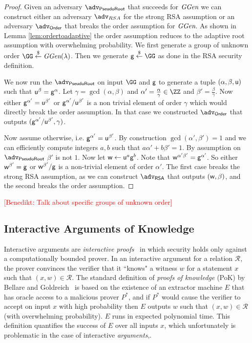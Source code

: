 \documentclass{article}
\theoremstyle{definition}
\newcommand{\benedikt}[1]{{\textcolor{red}{[Benedikt: #1]}}}
\newcommand{\benedikt}[1]{}
\begin{document}
\begin{proof}
	Given an adversary $\adv_{\textsf{PseudoRoot}}$ that succeeds for $\textit{GGen}$ we can construct either an adversary $\adv_{RSA}$ for the strong RSA assumption or an adversary $\adv_{\textsf{Order}}$ that breaks the order assumption for $\textit{GGen}$. As shown in Lemma \ref{lem:ordertoadaptive} the order assumption reduces to the adaptive root assumption with overwhelming probability. 
	We first generate a group of unknown order $\GG \sample \ggen(\lambda)$.
	Then we generate $\gr{g}\sample \GG$ as done in the \textsf{RSA} security definition.
	
	We now run the $\adv_{\textsf{PseudoRoot}}$ on input $\GG$ and $\mathsf{g}$ to generate a tuple $(\alpha,\beta,\mathsf{u})$ such that $\mathsf{u}^{\beta}=\mathsf{g}^{\alpha}$. Let $\gamma=\gcd(\alpha,\beta)$ and $\alpha'=\frac{\alpha}{\gamma}\in \ZZ$ and  $\beta'=\frac{\beta}{\gamma}$. Now either $\mathsf{g}^{\alpha'}=\mathsf{u}^{\beta'}$ or $\mathsf{g}^{\alpha'}/\mathsf{u}^{\beta'}$ is a non trivial element of order $\gamma$ which would directly break the order assumption. In that case we constructed $\adv_{\textsf{Order}}$ that outputs $(\mathsf{g}^{\alpha'}/\mathsf{u}^{\beta'},\gamma)$.
	
	Now assume otherwise, i.e. $\mathsf{g}^{\alpha'}=\mathsf{u}^{\beta'}$. By construction $\gcd(\alpha',\beta')=1$ and we can efficiently compute integers $a,b$ such that $a \alpha'+b \beta'=1$. By assumption on $\adv_{\textsf{PseudoRoot}}$ $\beta'$ is not $1$. Now let $\mathsf{w}\gets \mathsf{u}^{a}\mathsf{g}^{b}$. Note that $\mathsf{w}^{\alpha'\beta'}=\mathsf{g}^{\alpha'}$. So either $\mathsf{w}^{\beta'}=\mathsf{g}$ or $\mathsf{w}^{\beta'}/\mathsf{g}$ is a non-trivial element of order $\alpha'$. The first case breaks the strong RSA assumption, as we can construct $\adv_{\textsf{RSA}}$ that outputs $(\mathsf{w},\beta)$, and the second breaks the order assumption.
\end{proof}


\benedikt{Talk about specific groups of unknown order}

\subsection{Interactive Arguments of Knowledge}
Interactive arguments are \emph{interactive proofs}~\cite{GolMicRac89} in which security holds only against a computationally bounded prover. In an interactive argument for a relation $\mathcal{R}$, the prover convinces the verifier that it ``knows" a witness $w$ for a statement $x$ such that $(x, w) \in \mathcal{R}$. The standard definition of \emph{proofs of knowledge} (PoK) by Bellare and Goldreich~\cite{C:BelGol92} is based on the existence of an extractor machine $E$ that has oracle access to a malicious prover $P^*$, and if $P^*$ would cause the verifier to accept on input $x$ with high probability then $E$ outputs $w$ such that $(x, w) \in \mathcal{R}$ (with overwhelming probability). $E$ runs in expected polynomial time. This definition quantifies the success of $E$ over all inputs $x$, which unfortunately is problematic in the case of interactive  \emph{arguments},.
\end{document}
